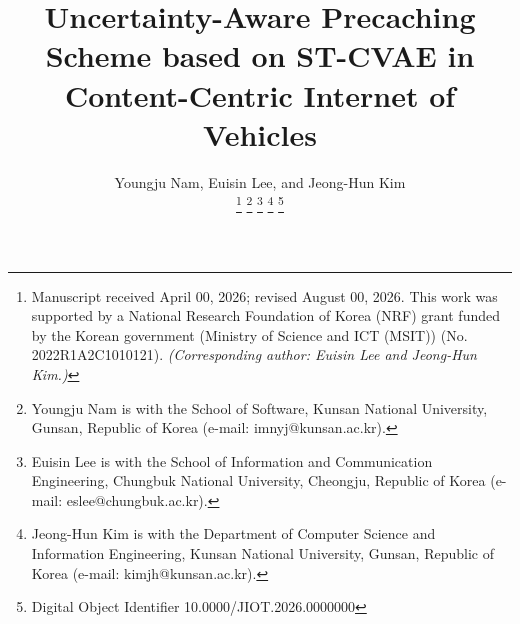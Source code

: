 \documentclass[journal]{IEEEtran}
\begin{document}
\title{Uncertainty-Aware Precaching Scheme based on ST-CVAE in Content-Centric Internet of Vehicles}
\newcommand{\orcidauthorA}{0000-0003-3971-0715} %
\newcommand{\orcidauthorB}{0000-0002-0422-0647} %
\newcommand{\orcidauthorC}{0000-0001-8209-5944} %

\author{Youngju Nam, Euisin Lee, and Jeong-Hun Kim

\thanks{Manuscript received April 00, 2026; revised August 00, 2026.
This work was supported by a National Research Foundation of Korea (NRF) grant funded by the Korean government (Ministry of Science and ICT (MSIT)) (No. 2022R1A2C1010121). \textit{(Corresponding author: Euisin Lee and Jeong-Hun Kim.)}}
\thanks{Youngju Nam is with the School of Software, Kunsan National University, Gunsan, Republic of Korea (e-mail: imnyj@kunsan.ac.kr).}
\thanks{Euisin Lee is with the School of Information and Communication Engineering, Chungbuk National University, Cheongju, Republic of Korea (e-mail: eslee@chungbuk.ac.kr).}
\thanks{Jeong-Hun Kim is with the Department of Computer Science and Information Engineering, Kunsan National University, Gunsan, Republic of Korea (e-mail: kimjh@kunsan.ac.kr).}
\thanks{Digital Object Identifier 10.0000/JIOT.2026.0000000}}

\end{document}
